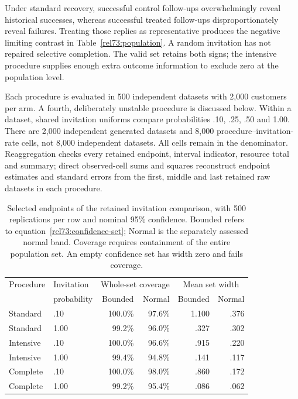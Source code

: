Under standard recovery, successful control follow-ups overwhelmingly reveal
historical successes, whereas successful treated follow-ups disproportionately
reveal failures. Treating those replies as representative produces the
negative limiting contrast in Table~\ref{rel73:population}. A random
invitation has not repaired selective completion. The valid set retains
both signs; the intensive procedure supplies enough extra outcome information
to exclude zero at the population level.

Each procedure is evaluated in 500 independent datasets with 2,000 customers
per arm. A fourth, deliberately unstable procedure is discussed below.
Within a dataset, shared invitation uniforms compare probabilities
.10, .25, .50 and 1.00. There are 2,000 independent generated datasets and
8,000 procedure--invitation-rate cells, not 8,000 independent datasets.
All cells remain in the denominator. Reaggregation checks every retained
endpoint, interval indicator, resource total and summary; direct observed-cell
sums and squares reconstruct endpoint estimates and standard errors from
the first, middle and last retained raw datasets in each procedure.

\begin{table}[htbp]
\centering\small
\begin{tabular}{llrrrr}
\toprule
Procedure & Invitation & \multicolumn{2}{c}{Whole-set coverage}
 & \multicolumn{2}{c}{Mean set width}\\
 & probability & Bounded & Normal & Bounded & Normal\\
\midrule
Standard & .10 & 100.0\% & 97.6\% & 1.100 & .376\\
Standard & 1.00 & 99.2\% & 96.0\% & .327 & .302\\
Intensive & .10 & 100.0\% & 96.6\% & .915 & .220\\
Intensive & 1.00 & 99.4\% & 94.8\% & .141 & .117\\
Complete & .10 & 100.0\% & 98.0\% & .860 & .172\\
Complete & 1.00 & 99.2\% & 95.4\% & .086 & .062\\
\bottomrule
\end{tabular}
\caption{Selected endpoints of the retained invitation comparison, with
500 replications per row and nominal 95\% confidence. Bounded refers to
equation~\eqref{rel73:confidence-set}; Normal is the separately assessed
normal band. Coverage requires containment of the entire population set.
An empty confidence set has width zero and fails coverage.}
\label{rel73:coverage}
\end{table}

